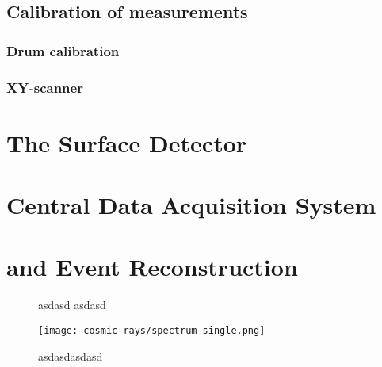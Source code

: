\subsection{Calibration of measurements}
\label{ssec:fd-calibration}

\subsubsection{Drum calibration}
\subsubsection{XY-scanner}

\section{The Surface Detector}
\label{sec:sd}


\section{Central Data Acquisition System}
\label{sec:cdas}



\section{\Offline and Event Reconstruction}
\label{sec:rec}

\begin{figure}[t]
  \centering
  \hspace{0.2cm}
  \caption[]{ asdasd  asdasd}
  \label{fig:}
\end{figure}

\begin{figure}[t]
  \centering
  \texttt{[image: cosmic-rays/spectrum-single.png]}
  \caption{asdasdasdasd}
  \label{fig:asdasd}
\end{figure}


